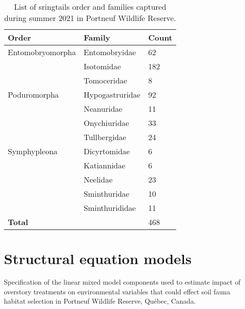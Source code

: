   \begin{table}[ht]
    \centering
    \caption[List of sringtails order and families]
    {List of sringtails order and families captured during summer 2021 in Portneuf Wildlife Reserve.}
    \label{tab:springtail}
    \begin{tabular}{lll} 
        \hline
        Order & Family & Count \\ [0.5ex] 
        \hline      
        Entomobryomorpha    & Entomobryidae     & 62 \\  
                            & Isotomidae        & 182 \\
                            & Tomoceridae       & 8 \\
        Poduromorpha        & Hypogastruridae   & 92 \\
                            & Neanuridae        & 11 \\
                            & Onychiuridae      & 33 \\
                            & Tullbergidae      & 24 \\
        Symphypleona        & Dicyrtomidae      & 6 \\
                            & Katiannidae       & 6 \\
                            & Neelidae          & 23 \\
                            & Sminthuridae      & 10 \\
                            & Sminthurididae    & 11 \\
                            \hline 
        \textbf{Total}      &                   & 468 \\
        \hline
    \end{tabular}
  \end{table}

  \clearpage

\section{Structural equation models}


\begin{table}[h!]
\caption[Specification of the linear mixed model components used to estimate impact of overstory treatments on environmental variables that could effect soil fauna habitat selection.]
{Specification of the linear mixed model components used to estimate impact of overstory treatments on environmental variables that could effect soil fauna habitat selection in Portneuf Wildlife Reserve, Québec, Canada.}
\label{ann:SEM_Env_eq}
\end{table}

